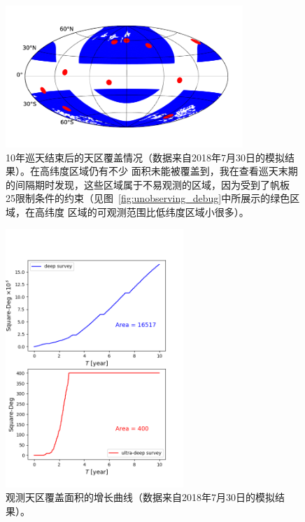 \documentclass[a4paper,11pt]{ctexart}
\begin{document}
\begin{figure}[h!]
\centering
\includegraphics[width=0.8\textwidth]{figures/covered_sky.png}
\caption{10年巡天结束后的天区覆盖情况（数据来自2018年7月30日的模拟结果）。在高纬度区域仍有不少
面积未能被覆盖到，我在查看巡天末期的间隔期时发现，这些区域属于不易观测的区域，因为受到了帆板
25\textdegree 限制条件的约束（见图~\ref{fig:unobserving_debug}中所展示的绿色区域，在高纬度
区域的可观测范围比低纬度区域小很多）。}
\label{fig:covered_sky}
\end{figure}

\begin{figure}[h!]
\centering
\includegraphics[width=0.6\textwidth]{figures/area_E20_b17.png}
\caption{观测天区覆盖面积的增长曲线（数据来自2018年7月30日的模拟结果）。}
\label{fig:area_growth}
\end{figure}
\end{document}
